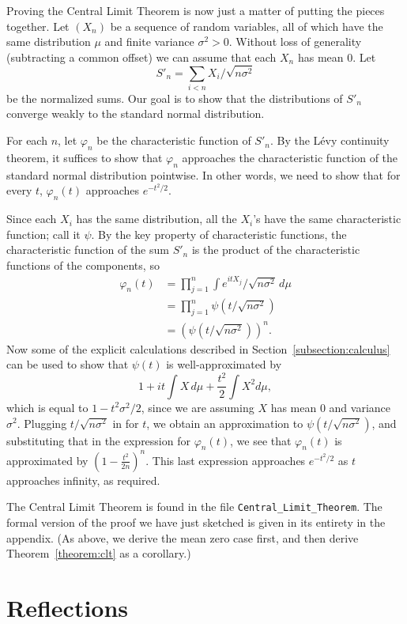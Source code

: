 \documentclass{svjour3}
\newcommand{\ph}{\varphi}
\begin{document}
Proving the Central Limit Theorem is now just a matter of putting the pieces together. Let $(X_n)$ be a sequence of random variables, all of which have the same distribution $\mu$ and finite variance $\sigma^2 > 0$. Without loss of generality (subtracting a common offset) we can assume that each $X_n$ has mean $0$. Let
\[
 S'_n = \sum_{i < n} X_i / \sqrt {n \sigma^2}
\]
be the normalized sums. Our goal is to show that the distributions of $S'_n$ converge weakly to the standard normal distribution.

For each $n$, let $\ph_n$ be the characteristic function of $S'_n$. By the L\'evy continuity theorem, it suffices to show that $\ph_n$ approaches the characteristic function of the standard normal distribution pointwise. In other words, we need to show that for every $t$, $\ph_n(t)$ approaches $e^{-t^2/2}$.

Since each $X_i$ has the same distribution, all the $X_i$'s have the same characteristic function; call it $\psi$. By the key property of characteristic functions, the characteristic function of the sum $S'_n$ is the product of the characteristic functions of the components, so
\begin{align*}
 \ph_n(t) & = \prod_{j = 1}^n \int e^{itX_j} / \sqrt{n \sigma^2} \, d\mu \\
   & = \prod_{j = 1}^n \psi(t / \sqrt{n \sigma^2}) \\
   & = (\psi(t / \sqrt{n \sigma^2}))^n.
\end{align*}
Now some of the explicit calculations described in Section~\ref{subsection:calculus} can be used to show that $\psi(t)$ is well-approximated by
\[
1 + it \int X \, d\mu + \frac{t^2}{2} \int X^2 d\mu,
\]
which is equal to $1 - t^2\sigma^2 / 2$, since we are assuming $X$ has mean $0$ and variance $\sigma^2$. Plugging $t / \sqrt{n \sigma^2}$ in for $t$, we obtain an approximation to $\psi(t / \sqrt{n \sigma^2})$, and substituting that in the expression for $\ph_n(t)$, we see that $\ph_n(t)$ is approximated by $(1 - \frac{t^2}{2n})^n$. This last expression approaches $e^{-t^2/2}$ as $t$ approaches infinity, as required.

The Central Limit Theorem is found in the file \texttt{Central\_Limit\_Theorem}. The formal version of the proof we have just sketched is given in its entirety in the appendix. (As above, we derive the mean zero case first, and then derive Theorem~\ref{theorem:clt} as a corollary.)

\section{Reflections}
\label{section:reflections}
\end{document}
